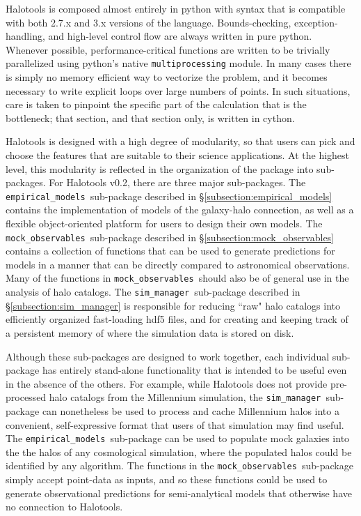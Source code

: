 \documentclass[usenatbib,usegraphicx,letterpaper]{mn2e}
\newcommand{\mockobs}{{\tt mock\_observables }}
\newcommand{\emodels}{{\tt empirical\_models }}
\newcommand{\sims}{{\tt sim\_manager }}
\begin{document}
Halotools is composed almost entirely in python with syntax that is compatible with both 2.7.x and 3.x versions of the language. Bounds-checking, exception-handling, and high-level control flow are always written in pure python. Whenever possible, performance-critical functions are written to be trivially parallelized using python's native {\tt multiprocessing} module. In many cases there is simply no memory efficient way to vectorize the problem, and it becomes necessary to write explicit loops over large numbers of points. In such situations, care is taken to pinpoint the specific part of the calculation that is the bottleneck; that section, and that section only, is written in cython. 

Halotools is designed with a high degree of modularity, so that users can pick and choose the features that are suitable to their science applications. At the highest level, this modularity is reflected in the organization of the package into sub-packages. For Halotools v0.2, there are three major sub-packages. The \emodels sub-package described in \S\ref{subsection:empirical_models} contains the implementation of models of the galaxy-halo connection, as well as a flexible object-oriented platform for users to design their own models. The \mockobs sub-package described in \S\ref{subsection:mock_observables} contains a collection of functions that can be used to generate predictions for models in a manner that can be directly compared to astronomical observations. Many of the functions in \mockobs should also be of general use in the analysis of halo catalogs. The \sims sub-package described in \S\ref{subsection:sim_manager} is responsible for reducing ``raw" halo catalogs into efficiently organized fast-loading hdf5 files, and for creating and keeping track of a persistent memory of where the simulation data is stored on disk. 

Although these sub-packages are designed to work together, each individual sub-package has entirely stand-alone functionality that is intended to be useful even in the absence of the others. For example, while Halotools does not provide pre-processed halo catalogs from the Millennium simulation, the \sims sub-package can nonetheless be used to process and cache Millennium halos into a convenient, self-expressive format that users of that simulation may find useful. The \emodels sub-package can be used to populate mock galaxies into the the halos of any cosmological simulation, where the populated halos could be identified by any algorithm. The functions in the \mockobs sub-package simply accept point-data as inputs, and so these functions could be used to generate observational predictions for semi-analytical models that otherwise have no connection to Halotools. 
\end{document}
